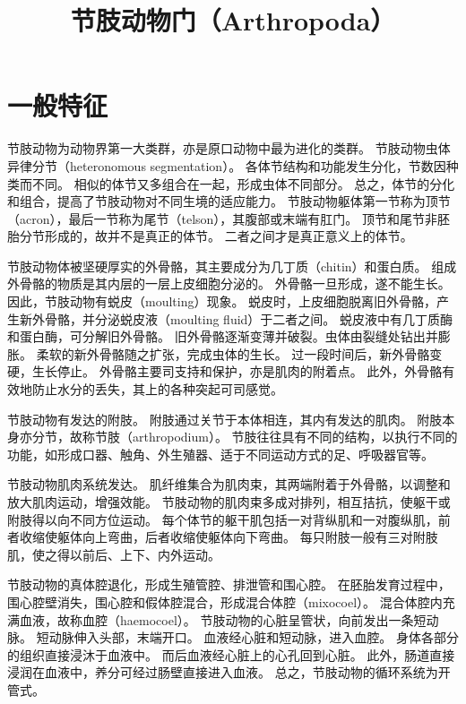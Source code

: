 \documentclass[11pt]{article}
\title{节肢动物门（Arthropoda）}
\date{}
\begin{document}
  \maketitle

  \linenumbers
  
\section{一般特征}
节肢动物为动物界第一大类群，亦是原口动物中最为进化的类群。
节肢动物虫体异律分节（heteronomous segmentation）。
各体节结构和功能发生分化，节数因种类而不同。
相似的体节又多组合在一起，形成虫体不同部分。
总之，体节的分化和组合，提高了节肢动物对不同生境的适应能力。
节肢动物躯体第一节称为顶节（acron），最后一节称为尾节（telson），其腹部或末端有肛门。
顶节和尾节非胚胎分节形成的，故并不是真正的体节。
二者之间才是真正意义上的体节。

\newline

节肢动物体被坚硬厚实的外骨骼，其主要成分为几丁质（chitin）和蛋白质。
组成外骨骼的物质是其内层的一层上皮细胞分泌的。
外骨骼一旦形成，遂不能生长。
因此，节肢动物有蜕皮（moulting）现象。
蜕皮时，上皮细胞脱离旧外骨骼，产生新外骨骼，并分泌蜕皮液（moulting fluid）于二者之间。
蜕皮液中有几丁质酶和蛋白酶，可分解旧外骨骼。
旧外骨骼逐渐变薄并破裂。虫体由裂缝处钻出并膨胀。
柔软的新外骨骼随之扩张，完成虫体的生长。
过一段时间后，新外骨骼变硬，生长停止。
外骨骼主要司支持和保护，亦是肌肉的附着点。
此外，外骨骼有效地防止水分的丢失，其上的各种突起可司感觉。

\newline

节肢动物有发达的附肢。
附肢通过关节于本体相连，其内有发达的肌肉。
附肢本身亦分节，故称节肢（arthropodium）。
节肢往往具有不同的结构，以执行不同的功能，如形成口器、触角、外生殖器、适于不同运动方式的足、呼吸器官等。

\newline

节肢动物肌肉系统发达。
肌纤维集合为肌肉束，其两端附着于外骨骼，以调整和放大肌肉运动，增强效能。
节肢动物的肌肉束多成对排列，相互拮抗，使躯干或附肢得以向不同方位运动。
每个体节的躯干肌包括一对背纵肌和一对腹纵肌，前者收缩使躯体向上弯曲，后者收缩使躯体向下弯曲。
每只附肢一般有三对附肢肌，使之得以前后、上下、内外运动。

\newline

节肢动物的真体腔退化，形成生殖管腔、排泄管和围心腔。
在胚胎发育过程中，围心腔壁消失，围心腔和假体腔混合，形成混合体腔（mixocoel）。
混合体腔内充满血液，故称血腔（haemocoel）。
节肢动物的心脏呈管状，向前发出一条短动脉。
短动脉伸入头部，末端开口。
血液经心脏和短动脉，进入血腔。
身体各部分的组织直接浸沐于血液中。
而后血液经心脏上的心孔回到心脏。
此外，肠道直接浸润在血液中，养分可经过肠壁直接进入血液。
总之，节肢动物的循环系统为开管式。
\end{document}
